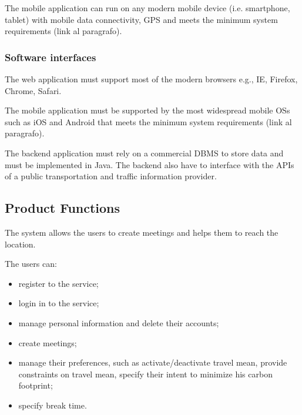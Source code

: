 \documentclass{article}
\begin{document}
	\bigskip
	The mobile application can run on any modern mobile device (i.e. smartphone, tablet) with mobile data connectivity,  GPS and meets the minimum system requirements (link al paragrafo).


	\subsubsection{Software interfaces}
	The web application must support most of the modern browsers e.g., IE, Firefox, Chrome, Safari.
	
	\bigskip
	The mobile application must be supported by the most widespread mobile OSs such as iOS and Android that meets the minimum system requirements (link al paragrafo).

	\bigskip
	The backend application must rely on a commercial DBMS to store data and must be implemented in Java.
	The backend also have to interface with the APIs of a public transportation and  traffic information provider.
	
	
	\subsection{Product Functions}
	The system allows the users to create meetings and helps them to reach the location.
	
	The users can:
	\begin{itemize}
		\item register to the service;
		\item login in to the service;
		\item manage personal information and delete their accounts;
		\item create meetings;
		\item manage their preferences, such as activate/deactivate travel mean, provide constraints on travel mean, specify their intent to minimize his carbon footprint;
		\item specify break time.
	\end{itemize}
	
\end{document}
